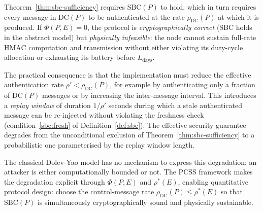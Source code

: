 \begin{remark}
\label{rem:phi-degradation}
Theorem~\ref{thm:sbc-sufficiency} requires $\mathrm{SBC}(P)$ to hold, which
in turn requires every message in $\mathrm{DC}(P)$ to be authenticated at
the rate $\rho_{\mathrm{DC}}(P)$ at which it is produced.  If
$\Phi(P, E) = 0$, the protocol is \emph{cryptographically correct} (SBC
holds in the abstract model) but \emph{physically infeasible}: the node
cannot sustain full-rate HMAC computation and transmission without either
violating its duty-cycle allocation or exhausting its battery before
$L_{\mathrm{days}}$.

The practical consequence is that the implementation must reduce the
effective authentication rate $\rho' < \rho_{\mathrm{DC}}(P)$, for example
by authenticating only a fraction of $\mathrm{DC}(P)$ messages or by
increasing the inter-message interval.  This introduces a \emph{replay
window} of duration $1/\rho'$ seconds during which a stale authenticated
message can be re-injected without violating the freshness check
(condition~\ref{sbc:fresh} of Definition~\ref{def:sbc}).  The effective
security guarantee degrades from the unconditional exclusion of
Theorem~\ref{thm:sbc-sufficiency} to a probabilistic one parameterised
by the replay window length.

The classical Dolev-Yao model has no mechanism to express this
degradation: an attacker is either computationally bounded or not.
The PCSS framework makes the degradation explicit through $\Phi(P, E)$
and $\rho^*(E)$, enabling quantitative protocol design: choose the
control-message rate $\rho_{\mathrm{DC}}(P) \le \rho^*(E)$ so that
$\mathrm{SBC}(P)$ is simultaneously cryptographically sound and
physically sustainable.
\end{remark}

